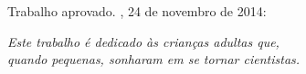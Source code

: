 \documentclass[12pt,brazilian,twoside]{abntex2}
\begin{document}
\pretextual

\imprimircapa

\imprimirfolhaderosto

\begin{folhadeaprovacao}
 
  \begin{center}
    {\ABNTEXchapterfont\large\imprimirautor}
 
    \vspace*{\fill}\vspace*{\fill}
    {\ABNTEXchapterfont\bfseries\Large\imprimirtitulo}
    \vspace*{\fill}
   
    \hspace{.45\textwidth}
    \begin{minipage}{.5\textwidth}
        \imprimirpreambulo
    \end{minipage}%
    \vspace*{\fill}
   \end{center}
   
   Trabalho aprovado. \imprimirlocal, 24 de novembro de 2014:
 
     
   \begin{center}
    \vspace*{0.5cm}
    {\large\imprimirlocal}
    \par
    {\large\imprimirdata}
    \vspace*{1cm}
  \end{center}
 
\end{folhadeaprovacao}

\begin{dedicatoria}
   \vspace*{\fill}
   \centering
   \noindent
   \textit{ Este trabalho é dedicado às crianças adultas que,\\
   quando pequenas, sonharam em se tornar cientistas.} \vspace*{\fill}
\end{dedicatoria}
\end{document}
